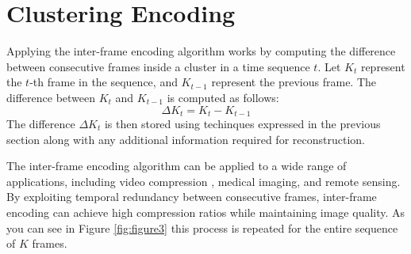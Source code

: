 \documentclass[twocolumn]{article}
\begin{document}
\section{Clustering Encoding}
Applying the inter-frame encoding algorithm works by computing the difference between consecutive frames inside a cluster in a time sequence $t$. Let $K_{t}$ represent the $t$-th frame in the sequence, and $K_{t-1}$ represent the previous frame. The difference between $K_{t}$ and $K_{t-1}$ is computed as follows:
\[
\Delta K_{t} = K_{t} - K_{t-1}
\]
The difference $\Delta K_{t}$ is then stored using techinques expressed in the previous section along with any additional information required for reconstruction.

The inter-frame encoding algorithm can be applied to a wide range of applications, including video compression \cite{belyaev2023efficient} \cite{girod2005distributed} \cite{koga1981statistical}, medical imaging, and remote sensing. By exploiting temporal redundancy between consecutive frames, inter-frame encoding can achieve high compression ratios while maintaining image quality. As you can see in Figure \ref{fig:figure3} this process is repeated for the entire sequence of $K$ frames.
\end{document}
